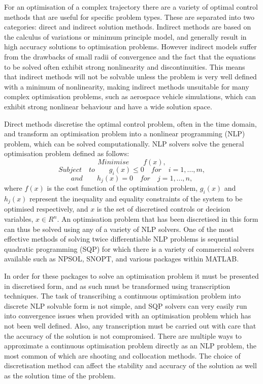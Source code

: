 For an optimisation of a complex trajectory there are a variety of optimal control methods that are useful for specific problem types. These are separated into two categories: direct and indirect solution methods\cite{Betts1998}. Indirect methods are based on the calculus of variations or minimum principle model, and generally result in high accuracy solutions to optimisation problems\cite{Bulirsch1993}. However indirect models suffer from the drawbacks of small radii of convergence and the fact that the equations to be solved often exhibit strong nonlinearity and discontinuities. This means that indirect methods will not be solvable unless the problem is very well defined with a minimum of nonlinearity, making indirect methods unsuitable for many complex optimisation problems, such as aerospace vehicle simulations, which can exhibit strong nonlinear behaviour and have a wide solution space. 

Direct methods discretise the optimal control problem, often in the time domain, and transform an optimisation problem into a nonlinear programming (NLP) problem, which can be solved computationally\cite{Stryk1992}. NLP solvers solve the general optimisation problem defined as follows\cite{Bazaraa2013}:
\begin{equation}
Minimise \qquad f(x),
\end{equation}
\begin{equation}
Subject \quad to \qquad g_i(x)\leq0 \quad for \quad i=1,...,m,
\end{equation}
\begin{equation}
and \qquad h_j(x) = 0 \quad for \quad j=1,...,n,
\end{equation}
where $f(x)$ is the cost function of the optimisation problem, $g_i(x)$ and $h_j(x)$ represent the inequality and equality constraints of the system to be optimised respectively, and $x$ is the set of discretised controls or decision variables, $x \in R^n$. 
An optimisation problem that has been discretised in this form can thus be solved using any of a variety of NLP solvers. One of the most effective methods of solving twice differentiable NLP problems is sequential quadratic programming (SQP)\cite{Boggs2000} for which there is a variety of commercial solvers available such as NPSOL, SNOPT, and various packages within MATLAB. 

In order for these packages to solve an optimisation problem it must be presented in discretised form, and as such must be transformed using transcription techniques\cite{Kelly2015}. The task of transcribing a continuous optimisation problem into discrete NLP solvable form is not simple, and SQP solvers can very easily run into convergence issues when provided with an optimisation problem which has not been well defined. Also, any transcription must be carried out with care that the accuracy of the solution is not compromised. 
There are multiple ways to approximate a continuous optimisation problem directly as an NLP problem, the most common of which are shooting and collocation methods. The choice of discretisation method can affect the stability and accuracy of the solution as well as the solution time of the problem. 

